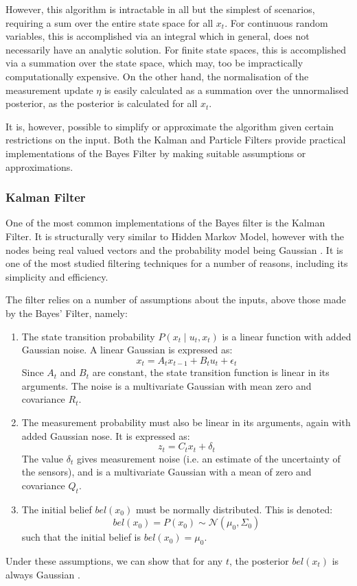 \documentclass[english]{article}
\begin{document}
However, this algorithm is intractable in all but the simplest of scenarios, requiring a sum over the entire state space for all $x_t$. For continuous random variables, this is accomplished via an integral which in general, does not necessarily have an analytic solution. For finite state spaces, this is accomplished via a summation over the state space, which may, too be impractically computationally expensive. On the other hand, the normalisation of the measurement update $\eta$ is easily calculated as a summation over the unnormalised posterior, as the posterior is calculated for all $x_t$.

It is, however, possible to simplify or approximate the algorithm given certain restrictions on the input. Both the Kalman and Particle Filters provide practical implementations of the Bayes Filter by making suitable assumptions or approximations.

\subsubsection{Kalman Filter}

One of the most common implementations of the Bayes filter is the Kalman Filter. It is structurally very similar to Hidden Markov Model, however with the nodes being real valued vectors and the probability model being Gaussian \cite{kalfilter}. It is one of the most studied filtering techniques for a number of reasons, including its simplicity and efficiency.

The filter relies on a number of assumptions about the inputs, above those made by the Bayes' Filter, namely:
\begin{enumerate}
	\item The state transition probability $P(x_{t} \mid u_t,x_t)$ is a linear function with added Gaussian noise. A linear Gaussian is expressed as:
		\begin{equation}
			x_{t} = A_{t} x_{t-1} + B_{t} u_{t} + \epsilon _{t}
		\end{equation}
		Since $A_{t}$ and $B_{t}$ are constant, the state transition function is linear in its arguments. The noise is a multivariate Gaussian with mean zero and covariance $R_t$.
	\item The measurement probability must also be linear in its arguments, again with added Gaussian nose. It is expressed as:
		\begin{equation}
			z_{t} = C_{t} x_{t} + \delta _{t}
		\end{equation}
		The value $\delta_t$ gives measurement noise (i.e. an estimate of the uncertainty of the sensors), and is a multivariate Gaussian with a mean of zero and covariance $Q_t$.
	\item The initial belief $bel(x_0)$ must be normally distributed. This is denoted:
		\begin{equation}
			bel(x_0) = P(x_0) \sim \mathcal{N}(\mu_0, \Sigma_0)
		\end{equation}
		such that the initial belief is $bel(x_0)=\mu_0$.
\end{enumerate}
Under these assumptions, we can show that for any $t$, the posterior $bel(x_{t})$ is always Gaussian \cite{kalmanderiv}.
\end{document}
